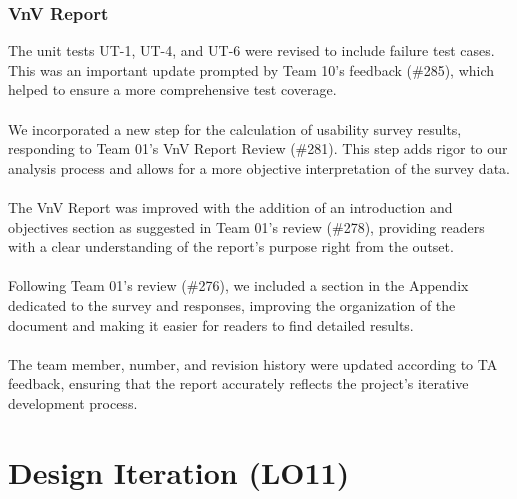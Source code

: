\documentclass{article}
\begin{document}
\subsubsection{VnV Report}
The unit tests UT-1, UT-4, and UT-6 were revised to include failure test cases. This was an important update prompted by Team 10's feedback (\#285), which helped to ensure a more comprehensive test coverage.\\
\\
We incorporated a new step for the calculation of usability survey results, responding to Team 01's VnV Report Review (\#281). This step adds rigor to our analysis process and allows for a more objective interpretation of the survey data.\\
\\
The VnV Report was improved with the addition of an introduction and objectives section as suggested in Team 01's review (\#278), providing readers with a clear understanding of the report's purpose right from the outset.\\
\\
Following Team 01's review (\#276), we included a section in the Appendix dedicated to the survey and responses, improving the organization of the document and making it easier for readers to find detailed results.\\
\\
The team member, number, and revision history were updated according to TA feedback, ensuring that the report accurately reflects the project's iterative development process.
\section{Design Iteration (LO11)}
\end{document}
